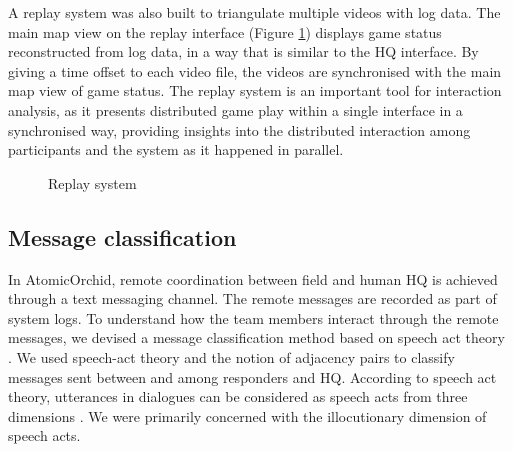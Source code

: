 A replay system was also built to triangulate multiple videos with log data. The main map view on the replay interface (Figure \ref{fig:replay}) displays game status reconstructed from log data, in a way that is similar to the HQ interface. By giving a time offset to each video file, the videos are synchronised with the main map view of game status. The replay system is an important tool for interaction analysis, as it presents distributed game play within a single interface in a synchronised way, providing insights into the distributed interaction among participants and the system as it happened in parallel. \\

\begin{figure}[H]
  \centering
  
   \caption{Replay system}
  \label{fig:replay}
\end{figure}
\newpage
\subsection{Message classification} \label{sec:aprmsg}
In AtomicOrchid, remote coordination between field and human HQ is achieved through a text messaging channel. The remote messages are recorded as part of system logs. To understand how the team members interact through the remote messages, we devised a message classification method based on speech act theory \citep{Searle1976}. We used speech-act theory and the notion of adjacency pairs \citep{Avrahami} to classify messages sent between and among responders and HQ. According to speech act theory, utterances in dialogues can be considered as speech acts from three dimensions \citep{Searle1976}. We were primarily concerned with the illocutionary dimension of speech acts.\\

